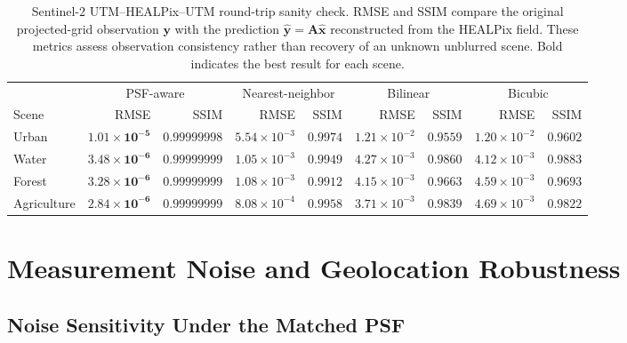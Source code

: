 \documentclass[journal]{IEEEtran}
\newcommand{\healpix}{HEALPix\xspace}
\newcommand{\utm}{UTM\xspace}
\newcommand{\psf}{PSF\xspace}
\begin{document}
\begin{table}[t]
\centering
\caption{Sentinel-2 \utm--\healpix--\utm round-trip sanity check.
RMSE and SSIM compare the original projected-grid observation
$\mathbf{y}$ with the prediction
$\widehat{\mathbf{y}}=\mathbf{A}\widehat{\mathbf{x}}$ reconstructed
from the \healpix field. These metrics assess observation
consistency rather than recovery of an unknown unblurred scene.
Bold indicates the best result for each scene.}
\label{tab:roundtrip_metrics}
\setlength{\tabcolsep}{5pt}
\begin{tabular}{lrrrrrrrr}
\toprule
 & \multicolumn{2}{c}{PSF-aware} & \multicolumn{2}{c}{Nearest-neighbor} & \multicolumn{2}{c}{Bilinear} & \multicolumn{2}{c}{Bicubic} \\
\cmidrule(lr){2-3}\cmidrule(lr){4-5}\cmidrule(lr){6-7}\cmidrule(lr){8-9}
Scene & RMSE & SSIM & RMSE & SSIM & RMSE & SSIM & RMSE & SSIM \\
\midrule
Urban       & $\mathbf{1.01\!\times\!10^{-5}}$ & $\mathbf{0.99999998}$ & $5.54\!\times\!10^{-3}$ & $0.9974$ & $1.21\!\times\!10^{-2}$ & $0.9559$ & $1.20\!\times\!10^{-2}$ & $0.9602$ \\
Water       & $\mathbf{3.48\!\times\!10^{-6}}$ & $\mathbf{0.99999999}$ & $1.05\!\times\!10^{-3}$ & $0.9949$ & $4.27\!\times\!10^{-3}$ & $0.9860$ & $4.12\!\times\!10^{-3}$ & $0.9883$ \\
Forest      & $\mathbf{3.28\!\times\!10^{-6}}$ & $\mathbf{0.99999999}$ & $1.08\!\times\!10^{-3}$ & $0.9912$ & $4.15\!\times\!10^{-3}$ & $0.9663$ & $4.59\!\times\!10^{-3}$ & $0.9693$ \\
Agriculture & $\mathbf{2.84\!\times\!10^{-6}}$ & $\mathbf{0.99999999}$ & $8.08\!\times\!10^{-4}$ & $0.9958$ & $3.71\!\times\!10^{-3}$ & $0.9839$ & $4.69\!\times\!10^{-3}$ & $0.9822$ \\
\bottomrule
\end{tabular}
\end{table}



\section{Measurement Noise and Geolocation Robustness}
\label{app:noise_geoloc}

\subsection{Noise Sensitivity Under the Matched \psf}
\label{sec:noise_matched}
\end{document}
